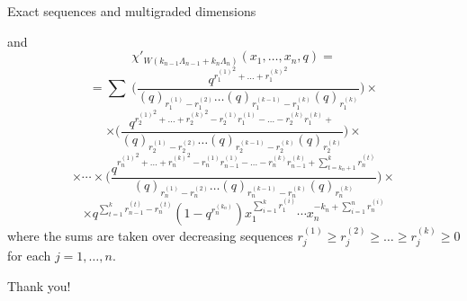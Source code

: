 \documentclass{beamer}
\begin{document}
\begin{frame}{Exact sequences and multigraded dimensions}
 \begin{corollary}
  and\small 
  $$
\chi'_{W(k_{n-1}\Lambda_{n-1} + k_{n}\Lambda_n)}(x_1,\dots,x_n,q)=
$$
$$
=\sum_{}\;
\bigg(\frac{q^{{r_{1}^{(1)}}^{2}+ \ldots + {r_{1}^{(k)}}^{2} 
}}{(q)_{r_{1}^{(1)} -
r_{1}^{(2)}} \ldots (q)_{r_{1}^{(k - 1)} - r_{1}^{(k)}}
(q)_{r_{1}^{(k)}}}\bigg)\times$$ $$\times
\bigg(\frac{q^{{r_{2}^{(1)}}^{2} + \ldots + {r_{2}^{(k)}}^{2} -
r_{2}^{(1)} r_{1}^{(1)} - \ldots - r_{2}^{(k)}r_{1}^{(k)}+
}}{(q)_{r_{2}^{(1)}
- r_{2}^{(2)}} \ldots (q)_{r_{2}^{(k - 1)}
- r_{2}^{(k)}} (q)_{r_{2}^{(k)}}}\bigg)\times$$
$$\times\cdots\times
\bigg(\frac{q^{{r_{n}^{(1)}}^{2} + \ldots + {r_{n}^{(k)}}^{2} -
r_{n}^{(1)} r_{n - 1}^{(1)} - \ldots - r_{n}^{(k)}r_{n - 1}^{(k)}+
\sum_{t=k_n+1}^{k} r_{n}^{(t)}
}
}{(q)_{r_{n}^{(1)}
- r_{n}^{(2)}} \ldots (q)_{r_{n}^{(k - 1)}
- r_{n}^{(k)}} (q)_{r_{n}^{(k)}}}\bigg) \times
$$
$$\times q^{\sum_{t=1}^kr_{n-1}^{(t)}-r_{n}^{(t)}}(1-q^{r_n^{(k_n)}})
x_1^{\sum_{i=1}^k r_1^{(i)}}\cdots x_n^{-k_n + \sum_{i=1}^n r_n^{(i)}}$$
where the sums are taken over decreasing sequences 
$r_j^{(1)} \ge r_j^{(2)} \ge \dots \ge r_j^{(k)} \ge 0$ for each $j=1,\dots,n$.
 \end{corollary}
\end{frame}


\begin{frame}{ }
\begin{center}
{\Huge Thank you!}
\end{center}
\end{frame}
\end{document}
